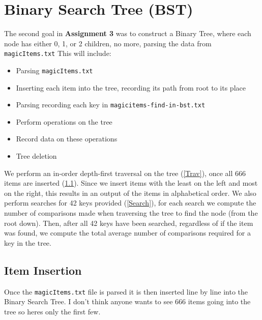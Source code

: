 \documentclass[12pt, letterpaper]{article}
\begin{document}
\section{Binary Search Tree (BST)} \label{BST}
The second goal in \textbf{Assignment 3} was to construct a Binary Tree, where each node has either 0, 1, or 2 children, no more, parsing the data from \texttt{magicItems.txt}
\vspace*{5pt}
\newline
This will include:
\begin{itemize}
   \item Parsing \texttt{magicItems.txt}
   \item Inserting each item into the tree, recording its path from root to its place
   \item Parsing recording each key in \texttt{magicitems-find-in-bst.txt}
   \item Perform operations on the tree
   \item Record data on these operations
   \item Tree deletion
\end{itemize}
We perform an in-order depth-first traversal on the tree (\ref{Trav}), once all 666 items are inserted (\ref{Insert}).
Since we insert items with the least on the left and most on the right, this results in an output of the items in alphabetical order.
We also perform searches for 42 keys provided (\ref{Search}), for each search we compute the number of comparisons made when traversing the tree to find the node (from the root down).
Then, after all 42 keys have been searched, regardless of if the item was found, we compute the total average number of comparisons required for a key in the tree.

\subsection{Item Insertion} \label{Insert}
Once the \texttt{magicItems.txt} file is parsed it is then inserted line by line into the Binary Search Tree.
I don't think anyone wants to see 666 items going into the tree so heres only the first few.
\end{document}
